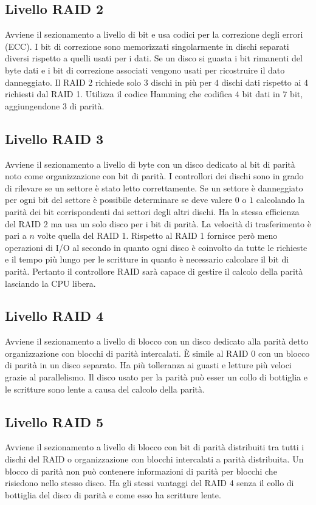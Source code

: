 \subsection{Livello RAID 2}
Avviene il sezionamento a livello di bit e usa codici per la correzione degli errori (ECC). I bit di correzione sono memorizzati singolarmente in dischi separati diversi rispetto a 
quelli usati per i dati. Se un disco si guasta i bit rimanenti del byte dati e i bit di correzione associati vengono usati per ricostruire il dato danneggiato. Il RAID 2 richiede solo 
$3$ dischi in pi\`u per $4$ dischi dati rispetto ai $4$ richiesti dal RAID 1. Utilizza il codice Hamming che codifica $4$ bit dati in $7$ bit, aggiungendone $3$ di parit\`a. 
\subsection{Livello RAID 3}
Avviene il sezionamento a livello di byte con un disco dedicato al bit di parit\`a noto come organizzazione con bit di parit\`a. I controllori dei dischi sono in grado di rilevare se 
un settore \`e stato letto correttamente. Se un settore \`e danneggiato per ogni bit del settore \`e possibile determinare se deve valere $0$ o $1$ calcolando la parit\`a dei bit
corrispondenti dai settori degli altri dischi. Ha la stessa efficienza del RAID 2 ma usa un solo disco per i bit di parit\`a. La velocit\`a di trasferimento \`e pari a $n$ volte quella
del RAID 1. Rispetto al RAID 1 fornisce per\`o meno operazioni di I/O al secondo in quanto ogni disco \`e coinvolto da tutte le richieste e il tempo pi\`u lungo per le scritture in
quanto \`e necessario calcolare il bit di parit\`a. Pertanto il controllore RAID sar\`a capace di gestire il calcolo della parit\`a lasciando la CPU libera. 
\subsection{Livello RAID 4}
Avviene il sezionamento a livello di blocco con un disco dedicato alla parit\`a detto organizzazione con blocchi di parit\`a intercalati. \`E simile al RAID 0 con un blocco di parit\`a
in un disco separato. Ha pi\`u tolleranza ai guasti e letture pi\`u veloci grazie al parallelismo. Il disco usato per la parit\`a pu\`o esser un collo di bottiglia e le scritture sono
lente a causa del calcolo della parit\`a. 
\subsection{Livello RAID 5}
Avviene il sezionamento a livello di blocco con bit di parit\`a distribuiti tra tutti i dischi del RAID o organizzazione con blocchi intercalati a parit\`a distribuita. Un blocco di 
parit\`a non pu\`o contenere informazioni di parit\`a per blocchi che risiedono nello stesso disco. Ha gli stessi vantaggi del RAID 4 senza il collo di bottiglia del disco di parit\`a
e come esso ha scritture lente. 
